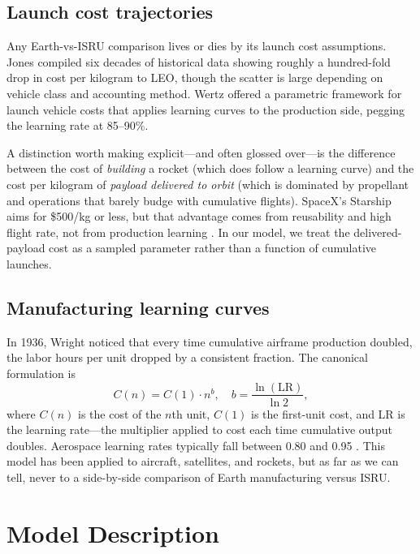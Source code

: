 \documentclass[preprint,12pt]{elsarticle}
\begin{document}
\subsection{Launch cost trajectories}

Any Earth-vs-ISRU comparison lives or dies by its launch cost assumptions. Jones \cite{jones2018} compiled six decades of historical data showing roughly a hundred-fold drop in cost per kilogram to LEO, though the scatter is large depending on vehicle class and accounting method. Wertz \cite{wertz2011} offered a parametric framework for launch vehicle costs that applies learning curves to the production side, pegging the learning rate at 85--90\%.

A distinction worth making explicit---and often glossed over---is the difference between the cost of \emph{building} a rocket (which does follow a learning curve) and the cost per kilogram of \emph{payload delivered to orbit} (which is dominated by propellant and operations that barely budge with cumulative flights). SpaceX's Starship aims for \$500/kg or less, but that advantage comes from reusability and high flight rate, not from production learning \cite{spacex2023}. In our model, we treat the delivered-payload cost as a sampled parameter rather than a function of cumulative launches.

\subsection{Manufacturing learning curves}

In 1936, Wright \cite{wright1936} noticed that every time cumulative airframe production doubled, the labor hours per unit dropped by a consistent fraction. The canonical formulation is
\begin{equation}
  C(n) = C(1) \cdot n^{b}, \quad b = \frac{\ln(\text{LR})}{\ln 2},
  \label{eq:wright}
\end{equation}
where $C(n)$ is the cost of the $n$th unit, $C(1)$ is the first-unit cost, and LR is the learning rate---the multiplier applied to cost each time cumulative output doubles. Aerospace learning rates typically fall between 0.80 and 0.95 \cite{wertz2011}. This model has been applied to aircraft, satellites, and rockets, but as far as we can tell, never to a side-by-side comparison of Earth manufacturing versus ISRU.

\section{Model Description}
\label{sec:model}
\end{document}
